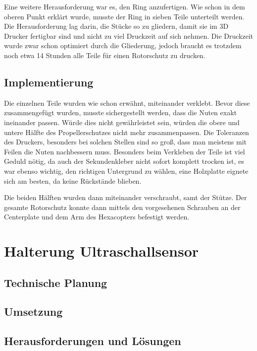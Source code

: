 	Eine weitere Herausforderung war es, den Ring anzufertigen. Wie schon in dem oberen Punkt erklärt wurde, musste der Ring in sieben Teile unterteilt werden.
	Die Herausforderung lag darin, die Stücke so zu gliedern, damit sie im 3D Drucker fertigbar sind und nicht zu viel Druckzeit auf sich nehmen.
	Die Druckzeit wurde zwar schon optimiert durch die Gliederung, jedoch braucht es trotzdem noch etwa 14 Stunden alle Teile für einen Rotorschutz zu drucken.

	\subsection{Implementierung}

Die einzelnen Teile wurden wie schon erwähnt, miteinander verklebt. Bevor diese zusammengefügt wurden, musste sichergestellt werden, dass die Nuten exakt ineinander passen.
Würde dies nicht gewährleistet sein, würden die obere und untere Hälfte des Propellerschutzes nicht mehr zusammenpassen.
Die Toleranzen des Druckers, besonders bei solchen Stellen sind so groß, dass man meistens mit Feilen die Nuten nachbessern muss.
Besonders beim Verkleben der Teile ist viel Geduld nötig, da auch der Sekundenkleber nicht sofort komplett trocken ist,
es war ebenso wichtig, den richtigen Untergrund zu wählen, eine Holzplatte eignete sich am besten, da keine Rückstände blieben.

Die beiden Hälften wurden dann miteinander verschraubt, samt der Stütze.
Der gesamte Rotorschutz konnte dann mittels den vorgesehenen Schrauben an der Centerplate und dem Arm des Hexacopters befestigt werden.

\section{Halterung Ultraschallsensor}

	\subsection{Technische Planung}

	\subsection{Umsetzung}

	\subsection{Herausforderungen und Lösungen}

